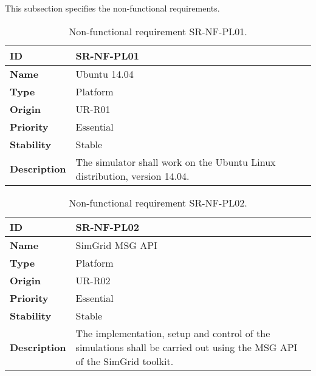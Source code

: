 This subsection specifies the non-functional requirements.

\begin{center}
\begin{table*}[htbp]
\centering
\begin{tabular}{@{}p{2.5cm} p{9cm}@{}} 
\toprule
\textbf{ID} 				& SR-NF-PL01\\
\midrule
\textbf{Name} 			& Ubuntu 14.04 \\
\midrule
\textbf{Type} 			& Platform \\
\midrule
\textbf{Origin} 			& UR-R01 \\
\midrule
\textbf{Priority}		& Essential \\
\midrule
\textbf{Stability} 		& Stable \\
\midrule
\textbf{Description} 	& The simulator shall work on the Ubuntu Linux distribution, version 14.04. \\
\bottomrule
\end{tabular}
\caption{Non-functional requirement SR-NF-PL01.}
\label{tab:srnfpl01}
\end{table*}
\end{center}

\begin{center}
\begin{table*}[htbp]
\centering
\begin{tabular}{@{}p{2.5cm} p{9cm}@{}} 
\toprule
\textbf{ID} 				& SR-NF-PL02\\
\midrule
\textbf{Name} 			& SimGrid MSG API \\
\midrule
\textbf{Type} 			& Platform \\
\midrule
\textbf{Origin} 			& UR-R02 \\
\midrule
\textbf{Priority}		& Essential \\
\midrule
\textbf{Stability} 		& Stable \\
\midrule
\textbf{Description} 	& The implementation, setup and control of the simulations shall be carried out using the MSG API of the SimGrid toolkit. \\
\bottomrule
\end{tabular}
\caption{Non-functional requirement SR-NF-PL02.}
\label{tab:srnfpl02}
\end{table*}
\end{center}

